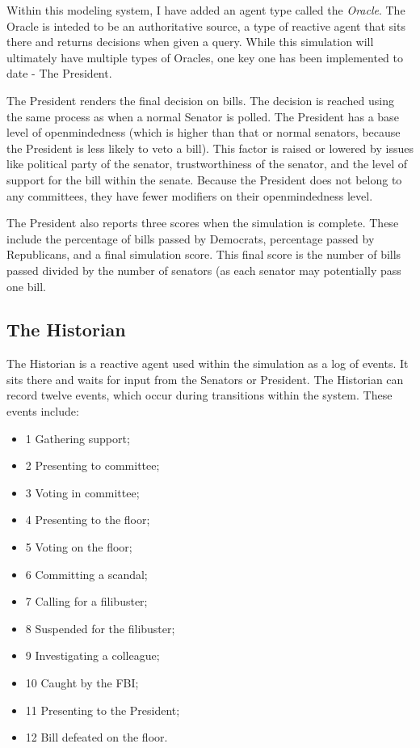 \documentclass{sig-alternate}
\newenvironment{smallitem}
 {\setlength{\topsep}{0pt}
  \setlength{\partopsep}{0pt}
  \setlength{\parskip}{0pt}
  \begin{itemize}
   \setlength{\leftmargin}{.2in}
  \setlength{\parsep}{0pt}
  \setlength{\parskip}{0pt}
  \setlength{\itemsep}{0pt}}
 {\end{itemize}}
\newcommand{\bi}{\begin{smallitem}}
\newcommand{\ei}{\end{smallitem}}
\begin{document}
Within this modeling system, I have added an agent type called the {\em Oracle}. The Oracle is inteded to be an authoritative source, a type 
of reactive agent that sits there and returns decisions when given
a query. While this simulation will ultimately have multiple types of 
Oracles, one key one has been implemented to date - The President.

The President renders the final decision on bills. The decision is
reached using the same process as when a normal Senator is polled. The
President has a base level of openmindedness (which is higher than
that or normal senators, because the President is less likely to veto
a bill). This factor is raised or lowered by issues like political party of the senator,
trustworthiness of the senator, and the level of support for the bill
within the senate. Because the President does not belong to any committees, 
they have fewer modifiers on their openmindedness level. 

The President also reports three scores when the simulation is complete.
These include the percentage of bills passed by Democrats, percentage passed by Republicans, and a final simulation score. This final score
is the number of bills passed divided by the number of senators (as
each senator may potentially pass one bill. 

\subsection{The Historian}
\label{sec:historian}

The Historian is a reactive agent used within the simulation as a log of events. It sits there and waits for input from the Senators or President.
The Historian can record twelve events, which occur during transitions within the system.
These events include:
\bi
\item [1] Gathering support;
\item [2] Presenting to committee;
\item [3] Voting in committee;
\item [4] Presenting to the floor;
\item [5] Voting on the floor;
\item [6] Committing a scandal;
\item [7] Calling for a filibuster;
\item [8] Suspended for the filibuster;
\item [9] Investigating a colleague;
\item [10] Caught by the FBI;
\item [11] Presenting to the President;
\item [12] Bill defeated on the floor.
\ei
\end{document}
